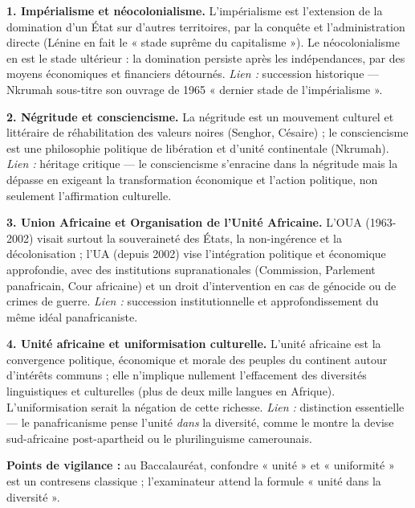 \documentclass[11pt]{article}
\begin{document}
\begin{corrige}

\textbf{1. Impérialisme et néocolonialisme.} L'impérialisme est l'extension de la domination d'un État sur d'autres territoires, par la conquête et l'administration directe (Lénine en fait le « stade suprême du capitalisme »). Le néocolonialisme en est le stade ultérieur : la domination persiste après les indépendances, par des moyens économiques et financiers détournés. \emph{Lien :} succession historique — Nkrumah sous-titre son ouvrage de 1965 « dernier stade de l'impérialisme ».

\textbf{2. Négritude et consciencisme.} La négritude est un mouvement culturel et littéraire de réhabilitation des valeurs noires (Senghor, Césaire) ; le consciencisme est une philosophie politique de libération et d'unité continentale (Nkrumah). \emph{Lien :} héritage critique — le consciencisme s'enracine dans la négritude mais la dépasse en exigeant la transformation économique et l'action politique, non seulement l'affirmation culturelle.

\textbf{3. Union Africaine et Organisation de l'Unité Africaine.} L'OUA (1963-2002) visait surtout la souveraineté des États, la non-ingérence et la décolonisation ; l'UA (depuis 2002) vise l'intégration politique et économique approfondie, avec des institutions supranationales (Commission, Parlement panafricain, Cour africaine) et un droit d'intervention en cas de génocide ou de crimes de guerre. \emph{Lien :} succession institutionnelle et approfondissement du même idéal panafricaniste.

\textbf{4. Unité africaine et uniformisation culturelle.} L'unité africaine est la convergence politique, économique et morale des peuples du continent autour d'intérêts communs ; elle n'implique nullement l'effacement des diversités linguistiques et culturelles (plus de deux mille langues en Afrique). L'uniformisation serait la négation de cette richesse. \emph{Lien :} distinction essentielle — le panafricanisme pense l'unité \emph{dans} la diversité, comme le montre la devise sud-africaine post-apartheid ou le plurilinguisme camerounais.

\textbf{Points de vigilance :} au Baccalauréat, confondre « unité » et « uniformité » est un contresens classique ; l'examinateur attend la formule « unité dans la diversité ».
\end{corrige}
\end{document}
